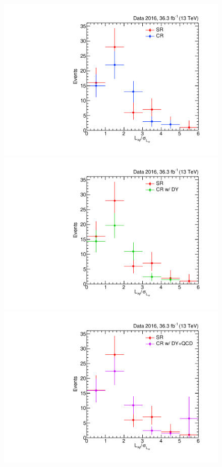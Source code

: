 \begin{figure}[htbp]
  \centering
  \includegraphics[width=\DSquareWidth]{figures/displaced/BGEST_smallLxySig_CR.pdf}
  \hspace*{-2em}
  \includegraphics[width=\DSquareWidth]{figures/displaced/BGEST_smallLxySig_CR_Corr.pdf} \\
  \includegraphics[width=\DSquareWidth]{figures/displaced/BGEST_smallLxySig_CR_Corr_SS.pdf}

\end{figure}
